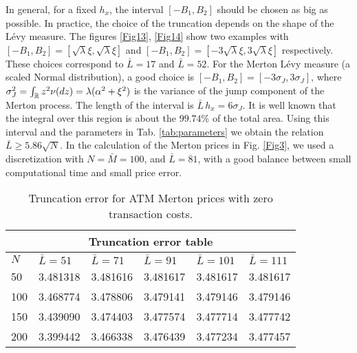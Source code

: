 In general, for a fixed $h_x$, the interval $[-B_1,B_2]$ should be chosen as big as possible. In practice, the choice of the truncation depends on the shape of the L\'evy measure.  
The figures \ref{Fig13}, \ref{Fig14} show two examples with $[-B_1,B_2] = [\sqrt{\lambda} \xi,\sqrt{\lambda} \xi]$ and $[-B_1,B_2] = [-3\sqrt{\lambda} \xi,3\sqrt{\lambda} \xi]$ 
respectively. These choices correspond to 
$\bar L = 17$ and $\bar L = 52$.
For the Merton L\'evy measure (a scaled Normal distribution), a good choice is $[-B_1,B_2] = [-3\sigma_J,3\sigma_J]$, where  
$\sigma_J^2 = \int_{\mathbb{R}} z^2 \nu(dz) = \lambda(\alpha^2 + \xi^2)$ is the variance of the jump component of the Merton process.
The length of the interval is $\bar L \, h_x = 6\sigma_J$. 
It is well known that the integral over this region is about the $99.74\%$ of the total area.      
Using this interval and the parameters in Tab. \ref{tab:parameters} we obtain the relation $\bar L \geq 5.86 \sqrt{N}$.
In the calculation of the Merton prices in Fig. \ref{Fig3}, we used a discretization with $N=\bar M =100$, and $\bar L = 81$, 
with a good balance between small computational time and small price error. 
\begin{table}[ht]
\centering
 \begin{tabular}{*{6}l}
 \toprule
  \multicolumn{6}{c}{\textbf{Truncation error table}} \\
  \midrule
  $N$ & $\bar L=51$ &   $\bar L=71$   & $\bar L=91$ & $\bar L=101$ & $\bar L=111$ \\
  \midrule
    50   & 3.481318 & 3.481616 & 3.481617 & 3.481617 & 3.481617  \\
    100  & 3.468774 & 3.478806 & 3.479141 & 3.479146 & 3.479146  \\
    150  & 3.439090 & 3.474403 & 3.477574 & 3.477714 & 3.477742  \\
    200  & 3.399442 & 3.466338 & 3.476439 & 3.477234 & 3.477457 \\
  \bottomrule
  \end{tabular}
  \caption{Truncation error for ATM Merton prices with zero transaction costs.}
  \label{tab:convergence2}
\end{table}

